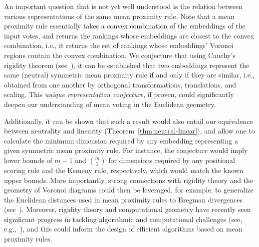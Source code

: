 \documentclass[prodmode]{acmsmall-ec14}
\begin{document}
An important question that is not yet well understood is the relation between various representations of the same mean proximity rule. Note that a mean proximity rule essentially takes a convex combination of the embeddings of the input votes, and returns the rankings whose embeddings are closest to the convex combination, i.e., it returns the set of rankings whose embeddings' Voronoi regions contain the convex combination. We conjecture that using Cauchy's rigidity theorem (see~\cite{aigner2010cauchy}), it can be established that two embeddings represent the same (neutral) symmetric mean proximity rule if and only if they are similar, i.e., obtained from one another by orthogonal transformations, translations, and scaling. This \emph{unique representation conjecture}, if proven, could significantly deepen our understanding of mean voting in the Euclidean geometry. 

Additionally, it can be shown that such a result would also entail our equivalence between neutrality and linearity (Theorem~\ref{thm:neutral-linear}), and allow one to calculate the minimum dimension required by any embedding representing a given symmetric mean proximity rule. For instance, the conjecture would imply lower bounds of $m-1$ and $\binom{m}{2}$ for dimensions required by any positional scoring rule and the Kemeny rule, respectively, which would match the known upper bounds.  More importantly, strong connections with rigidity theory and the geometry of Voronoi diagrams could then be leveraged, for example, to generalize the Euclidean distances used in mean proximity rules to Bregman divergences (see~\cite{boissonnat2010bregman}). Moreover, rigidity theory and computational geometry have recently seen significant progress in tackling algorithmic and computational challenges (see, e.g.,~\cite{biedl2007cauchy}), and this could inform the design of efficient algorithms based on mean proximity rules. 




\end{document}
